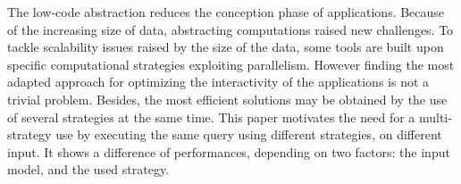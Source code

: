 The low-code abstraction reduces the conception phase of applications. Because of the
increasing size of data, abstracting computations raised new challenges. To tackle
scalability issues raised by the size of the data, some tools are  built upon specific
computational strategies exploiting parallelism. However finding the most adapted
approach for optimizing the interactivity of the applications is not a trivial problem.
Besides, the most efficient solutions may be obtained by the use of several strategies
at the same time. This paper motivates the need for a multi-strategy use by executing
the same query using different strategies, on different input. It shows a difference 
of performances, depending on two factors: the input model, and the used strategy.